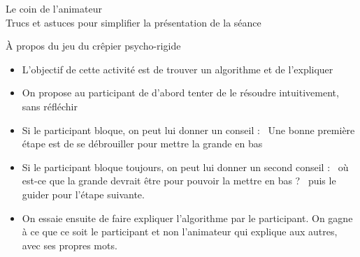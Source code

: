 \documentclass[final,hyperref={pdfpagelabels=false}]{beamer}
\renewcommand*{\large}{\fontsize{\resultlargeX}{\resultlargeY}\selectfont}
\begin{document}
\begin{frame}{Le coin de l'animateur\\[-5pt]
  {\large Trucs et astuces pour simplifier la présentation de la séance}}
  \begin{block}{À propos du jeu du crêpier psycho-rigide}
    \begin{itemize}
    \item L'objectif de cette activité est de trouver un algorithme et de
    l'expliquer 
    \item On propose au participant de d'abord tenter de le résoudre
    intuitivement, sans réfléchir
    \item Si le participant bloque, on peut lui donner un conseil : \og~Une
    bonne première étape est de se débrouiller pour mettre la grande en bas~\fg
    \item Si le participant bloque toujours, on peut lui donner un second
    conseil : \og~où est-ce que la grande devrait être pour pouvoir la mettre en
    bas ? ~\fg puis le guider pour l'étape suivante.
    \item On essaie ensuite de faire expliquer l'algorithme par le participant.
    On gagne à ce que ce soit le participant et non l'animateur qui explique aux
    autres, avec ses propres mots.
    \end{itemize}    
  \end{block}

\end{frame}
\end{document}

